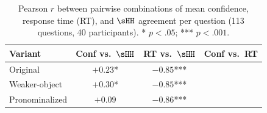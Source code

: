 \begin{table}[h]
\centering
\small
\caption{Pearson $r$ between pairwise combinations of mean confidence, response time (RT), and $\sHH$ agreement per question (113 questions, 40 participants). * $p<.05$; *** $p<.001$.}
\label{tab:conf_rt_sbert_r}
\begin{tabular}{lccc}
\toprule
Variant & Conf vs.\ $\sHH$ & RT vs.\ $\sHH$ & Conf vs.\ RT \\
\midrule
Original & $+0.23$* & $-0.85$*** \\
Weaker-object & $+0.30$* & $-0.85$*** \\
Pronominalized & $+0.09$ & $-0.86$*** \\
\bottomrule
\end{tabular}
\end{table}
